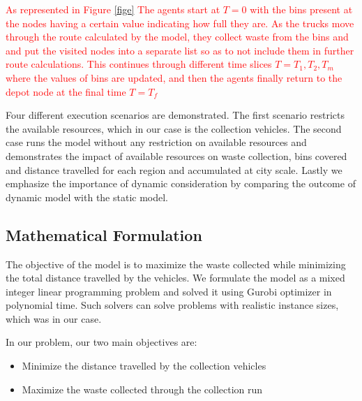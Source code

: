 \documentclass[12pt]{article}
\begin{document}
\textcolor{red}{As represented in Figure \ref{fige} The agents start at $T=0$ with the bins present at the nodes having a certain value indicating how full they are. As the trucks move through the route calculated by the model, they collect waste from the bins and and put the visited nodes into a separate list so as to not include them in further route calculations. This continues through different time slices $T=T_1,T_2,T_m$ where the values of bins are updated, and then the agents finally return to the depot node at the final time $T=T_f$}

Four different execution scenarios are demonstrated. The first scenario restricts the available resources, which in our case is the collection vehicles. The second case runs the model without any restriction on available resources and demonstrates the impact of available resources on waste collection, bins covered and distance travelled for each region and accumulated at city scale. Lastly we emphasize the importance of dynamic consideration by comparing the outcome of dynamic model with the static model.

\subsection {Mathematical Formulation}

The objective of the model is to maximize the waste collected while minimizing the total distance travelled by the vehicles. We formulate the model as a mixed integer linear programming problem and solved it using Gurobi optimizer \cite{gurobi} in polynomial time. Such solvers can solve problems with realistic instance sizes, which was in our case.

In our problem, our two main objectives are:
\begin{itemize}
    \item Minimize the distance travelled by the collection vehicles
    \item Maximize the waste collected through the collection run
\end{itemize}
\end{document}
